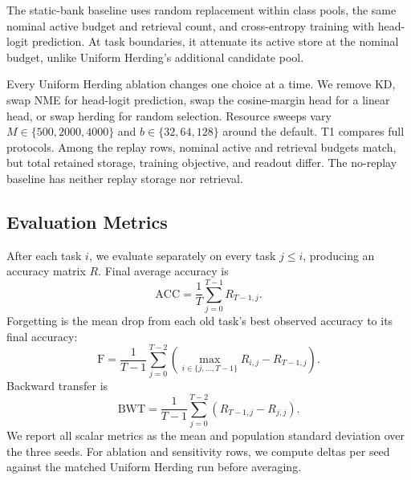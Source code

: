 The static-bank baseline uses random replacement within class pools, the same
nominal active budget and retrieval count, and cross-entropy training with
head-logit prediction.  At task boundaries, it attenuate its active store at
the nominal budget, unlike Uniform Herding's additional candidate pool.

Every Uniform Herding ablation changes one choice at a time. We remove KD,
swap NME for head-logit prediction, swap the cosine-margin head for a linear
head, or swap herding for random selection.  Resource sweeps vary
$M\in\{500,2000,4000\}$ and $b\in\{32,64,128\}$ around the default.  T1
compares full protocols.  Among the replay rows, nominal active and retrieval
budgets match, but total retained storage, training objective, and readout
differ. The no-replay baseline has neither replay storage nor retrieval.

\subsection{Evaluation Metrics}
\label{subsec:evaluation-metrics}

After each task $i$, we evaluate separately on every task $j\le i$, producing an
accuracy matrix $R$.  Final average accuracy is
\[
\mathrm{ACC}=\frac{1}{T}\sum_{j=0}^{T-1}R_{T-1,j}.
\]
Forgetting is the mean drop from each old task's best observed accuracy to its
final accuracy:
\[
\mathrm{F}=\frac{1}{T-1}\sum_{j=0}^{T-2}
\left(\max_{i\in\{j,\ldots,T-1\}}R_{i,j}-R_{T-1,j}\right).
\]
Backward transfer is
\[
\mathrm{BWT}=\frac{1}{T-1}\sum_{j=0}^{T-2}
\left(R_{T-1,j}-R_{j,j}\right).
\]
We report all scalar metrics as the mean and population standard deviation
over the three seeds.  For ablation and sensitivity rows, we compute deltas
per seed against the matched Uniform Herding run before averaging.
